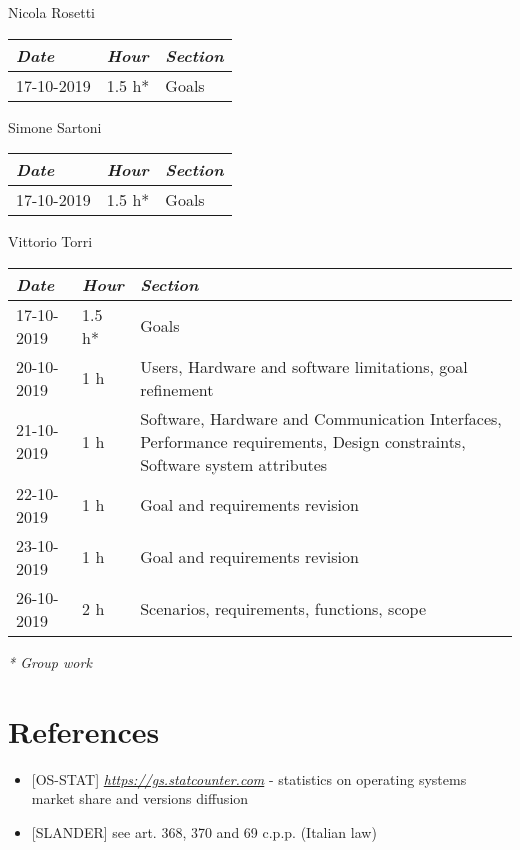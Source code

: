 \documentclass[a4paper]{report}
\begin{document}
\begin{center}
Nicola Rosetti \\
\begin{tabular}{p{2cm}p{1.5cm}p{7cm}}
\toprule
\textit{Date} & \textit{Hour} & \textit{Section} \\ \midrule
17-10-2019 & 1.5 h* & Goals \\
\bottomrule
\end{tabular}
\end{center}
\vspace*{1 cm}
\begin{center}
Simone Sartoni \\
\begin{tabular}{p{2cm}p{1.5cm}p{7cm}}
\toprule
\textit{Date} & \textit{Hour} & \textit{Section} \\ \midrule
17-10-2019 & 1.5 h* & Goals \\
\bottomrule
\end{tabular}
\end{center}
\vspace*{1 cm}
\begin{center}
Vittorio Torri \\
\begin{tabular}{p{2cm}p{1.5cm}p{7cm}}
\toprule
\textit{Date} & \textit{Hour} & \textit{Section} \\ \midrule
17-10-2019 & 1.5 h* & Goals \\ \midrule
20-10-2019 & 1 h & Users, Hardware and software limitations, goal refinement \\ \midrule
21-10-2019 & 1 h & Software, Hardware and Communication Interfaces, Performance requirements, Design constraints, Software system attributes \\ \midrule
22-10-2019 & 1 h & Goal and requirements revision \\ \midrule
23-10-2019 & 1 h & Goal and requirements revision \\ \midrule
26-10-2019 & 2 h & Scenarios, requirements, functions, scope \\
\bottomrule
\end{tabular}
\end{center}
\textit{* Group work}

\chapter{References}
\begin{itemize}

\item \label{ref:os-stats} [OS-STAT] \href{https://gs.statcounter.com}{\textit{https://gs.statcounter.com}} - statistics on operating systems market share and versions diffusion

\item \label{ref:slander} [SLANDER] see art. 368, 370 and 69 c.p.p. (Italian law)

\end{itemize}
\end{document}
